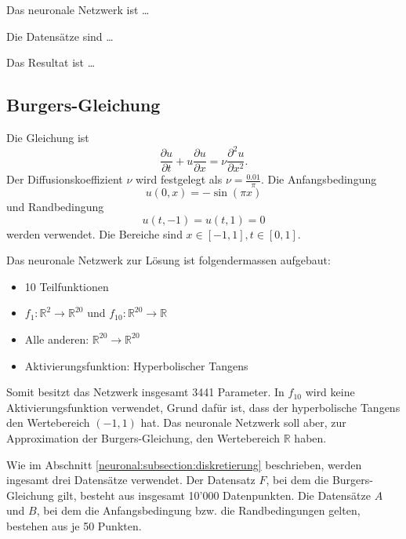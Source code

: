 Das neuronale Netzwerk ist \ldots

Die Datensätze sind \ldots

Das Resultat ist \ldots


\subsection{Burgers-Gleichung}\label{neuronal:subsection:burgers_gleichung}
Die Gleichung ist
\begin{equation}
    \frac{\partial u}{\partial t} + u \frac{\partial u}{\partial x} = \nu \frac{\partial^2 u}{\partial x^2}.
    \label{neuronal:burgers}
\end{equation}
Der Diffusionskoeffizient $\nu$ wird festgelegt als $\nu = \frac{0.01}{\pi}$.
Die Anfangsbedingung
\begin{equation}
    u(0, x) = - \sin(\pi x)
    \label{neuronal:burgers_anfang}
\end{equation}
und Randbedingung
\begin{equation}
    u(t, -1) = u(t, 1) = 0
    \label{neuronal:burgers_rand}
\end{equation}
werden verwendet.
Die Bereiche sind \( x \in [-1,1], t \in [0,1] \).

Das neuronale Netzwerk zur Lösung ist folgendermassen aufgebaut:
\begin{itemize}
    \item 10 Teilfunktionen
    \item $f_1: \mathbb{R}^2 \longrightarrow \mathbb{R}^{20}$ und $f_{10}: \mathbb{R}^{20} \longrightarrow \mathbb{R}$
    \item Alle anderen: $\mathbb{R}^{20} \longrightarrow \mathbb{R}^{20}$
    \item Aktivierungsfunktion: Hyperbolischer Tangens
\end{itemize}
Somit besitzt das Netzwerk insgesamt 3441 Parameter.
In $f_{10}$ wird keine Aktivierungsfunktion verwendet, Grund dafür ist, dass der hyperbolische Tangens den Wertebereich $(-1,1)$ hat.
Das neuronale Netzwerk soll aber, zur Approximation der Burgers-Gleichung, den Wertebereich $\mathbb{R}$ haben.

Wie im Abschnitt \ref{neuronal:subsection:diskretierung} beschrieben, werden ingesamt drei Datensätze verwendet.
Der Datensatz $F$, bei dem die Burgers-Gleichung gilt, besteht aus insgesamt 10'000 Datenpunkten.
Die Datensätze $A$ und $B$, bei dem die Anfangsbedingung bzw. die Randbedingungen gelten, bestehen aus je 50 Punkten.

